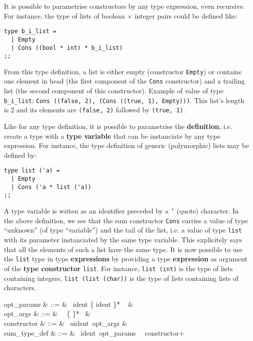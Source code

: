 It is possible to parametrise constructors by any type expression,
even recursive.
For instance, the type of lists of boolean $\times$ integer pairs
could be defined like:
{\scriptsize
\begin{lstlisting}
type b_i_list =
  | Empty
  | Cons ((bool * int) * b_i_list)
;;
\end{lstlisting}
}
From this type definition, a list is either empty (constructor
{\tt Empty}) or contains one element in head (the first component of
the {\tt Cons} constructor) and a trailing list (the second component
of this constructor). Example of value of type {\tt b\_i\_list}:
{\tt Cons ((false, 2), (Cons ((true, 1), Empty)))}. This list's length
is 2 and its elements are {\tt (false, 2)} followed by
{\tt (true, 1)}.

Like for any type definition, it is possible to parametrise the
{\bf definition}, i.e. create a type with a {\bf type variable} that
can be instanciate by any type expression. For instance, the type
definition of generic (polymorphic) lists may be defined by:
{\scriptsize
\begin{lstlisting}
type list ('a) =
  | Empty
  | Cons ('a * list ('a))
;;
\end{lstlisting}
}
A type variable is writen as an identifier preceded by a {\tt '}
(quote) character. In the above definition, we see that the sum
constructor {\tt Cons} carries a value of type ``unknown'' (of type
``variable'') and the tail of the list, i.e. a value of type
{\tt list} with its parameter instanciated by the same type
variable. This explicitely says that all the elements of such a list
have the same type. It is now possible to use the {\tt list} type in
type {\bf expressions} by providing a type {\bf expression} as
argument of the {\bf type constructor} {\tt list}. For instance,
{\tt list (int)} is the type of lists containing integers,
{\tt list (list (char))} is the type of lists containing lists of
characters.

\vspace{0.2cm}
\begin{syntax}
opt\_params & ::= & \epsilon
    \mid \terminal{(}\ ident \{\terminal{,} ident \}*
    \ \terminal{)} & \\
opt\_args & ::= & \epsilon
    \mid \terminal{(}\ \tau\ \{\terminal{,} \tau \}*\ \terminal{)} & \\
constructor & ::= & \terminal{\mid}\ uident\ opt\_args & \\
sum\_type\_def & ::= &
    \ ident\ opt\_params\  \terminal{=} \  constructor+
\end{syntax}
\vspace{0.2cm}



